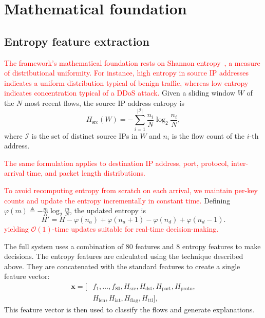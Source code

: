 \documentclass{ieeeaccess}
\begin{document}
\section{Mathematical foundation}
\label{sec:math}

\subsection{Entropy feature extraction}
\textcolor{red}{The framework's mathematical foundation rests on Shannon entropy~\cite{shannon1948mathematical}, a measure of distributional uniformity.} \textcolor{red}{For instance, high entropy in source IP addresses indicates a uniform distribution typical of benign traffic, whereas low entropy indicates concentration typical of a DDoS attack.} Given a sliding window $W$ of the $N$ most recent flows, the source IP address entropy is
\begin{equation}
H_{\mathrm{src}}(W) = -\sum_{i=1}^{|\mathcal{I}|} \frac{n_i}{N} \log_2 \frac{n_i}{N},
\label{eq:srcip}
\end{equation}
where $\mathcal{I}$ is the set of distinct source IPs in $W$ and $n_i$ is the flow count of the $i$-th address.

\textcolor{red}{The same formulation applies to destination IP address, port, protocol, inter-arrival time, and packet length distributions.}

\textcolor{red}{To avoid recomputing entropy from scratch on each arrival, we maintain per-key counts and update the entropy incrementally in constant time.} Defining $\varphi(m) \triangleq -\frac{m}{N}\log_2\frac{m}{N}$, the updated entropy is
\begin{equation}
H' = H - \varphi(n_a) + \varphi(n_a{+}1) - \varphi(n_d) + \varphi(n_d{-}1).
\label{eq:rolling}
\end{equation}
\textcolor{red}{yielding $\mathcal{O}(1)$-time updates suitable for real-time decision-making.}

The full system uses a combination of 80 features and 8 entropy features to make decisions. The entropy features are calculated using the technique described above. They are concatenated with the standard features to create a single feature vector:
\begin{equation}
\begin{aligned}
\mathbf{x} = \bigl[ &f_1, \ldots, f_{80}, H_{\mathrm{src}}, H_{\mathrm{dst}}, H_{\mathrm{port}}, H_{\mathrm{proto}}, \\
&H_{\mathrm{len}}, H_{\mathrm{iat}}, H_{\mathrm{flag}}, H_{\mathrm{ttl}} \bigr],
\end{aligned}
\label{eq:fvec}
\end{equation}
This feature vector is then used to classify the flows and generate explanations.
\end{document}
